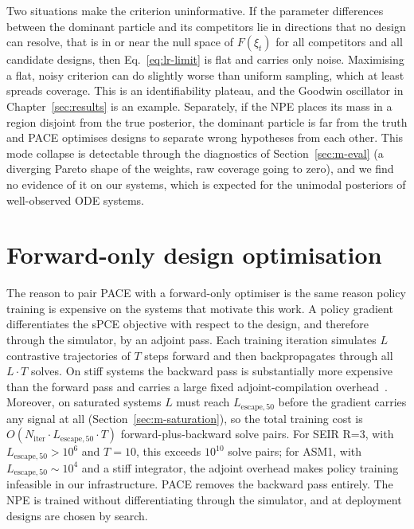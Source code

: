 Two situations make the criterion uninformative. If the parameter differences between
the dominant particle and its competitors lie in directions that no design can
resolve, that is in or near the null space of $F(\xi_t)$ for all competitors and all
candidate designs, then Eq.~\eqref{eq:lr-limit} is flat and carries only noise.
Maximising a flat, noisy criterion can do slightly worse than uniform sampling, which
at least spreads coverage. This is an identifiability plateau, and the Goodwin
oscillator in Chapter~\ref{sec:results} is an example. Separately, if the NPE places
its mass in a region disjoint from the true posterior, the dominant particle is far
from the truth and PACE optimises designs to separate wrong hypotheses from each
other. This mode collapse is detectable through the diagnostics of
Section~\ref{sec:m-eval} (a diverging Pareto shape of the weights, raw coverage going
to zero), and we find no evidence of it on our systems, which is expected for the
unimodal posteriors of well-observed ODE systems.

\section{Forward-only design optimisation}
\label{sec:m-forward}

The reason to pair PACE with a forward-only optimiser is the same reason policy
training is expensive on the systems that motivate this work. A policy gradient
differentiates the sPCE objective with respect to the design, and therefore through
the simulator, by an adjoint pass. Each training iteration simulates $L$ contrastive
trajectories of $T$ steps forward and then backpropagates through all $L\cdot T$
solves. On stiff systems the backward pass is substantially more expensive than the
forward pass and carries a large fixed adjoint-compilation overhead~\citep{fronk2024stiff,pal2023neural,caldana2025neural}.
Moreover, on saturated systems $L$ must reach $L_{\mathrm{escape},50}$ before the
gradient carries any signal at all (Section~\ref{sec:m-saturation}), so the total
training cost is $O(N_{\mathrm{iter}}\cdot L_{\mathrm{escape},50}\cdot T)$
forward-plus-backward solve pairs. For SEIR R=3, with $L_{\mathrm{escape},50}>10^6$ and
$T=10$, this exceeds $10^{10}$ solve pairs; for ASM1, with $L_{\mathrm{escape},50}\sim10^4$
and a stiff integrator, the adjoint overhead makes policy training infeasible in our
infrastructure. PACE removes the backward pass entirely. The NPE is trained without
differentiating through the simulator, and at deployment designs are chosen by search.

